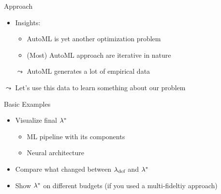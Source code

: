 \begin{frame}[c]{Approach}


\begin{itemize}
	\item \alert{Insights:}
	\begin{itemize}
		\item AutoML is yet another optimization problem
		\item (Most) AutoML approach are iterative in nature 
    \end{itemize}
	\item[$\leadsto$] AutoML generates a lot of empirical data 
\end{itemize}

\begin{center}
\scalebox{0.9}{
	
}
\end{center}

$\leadsto$ Let's use this data to learn something about our problem

\end{frame}
\begin{frame}[c]{Basic Examples}

\begin{itemize}
	\item Visualize final $\mathbf{\lambda}^*$
	\begin{itemize}
		\item ML pipeline with its components
		\item Neural architecture
	\end{itemize}
	\medskip
	\pause
	\item Compare what changed between $\mathbf{\lambda}_{\text{def}}$ and $\mathbf{\lambda}^*$
	\medskip
	\pause		
	\item Show $\mathbf{\lambda}^*$ on different budgets (if you used a multi-fideltiy approach)
\end{itemize}

\end{frame}
